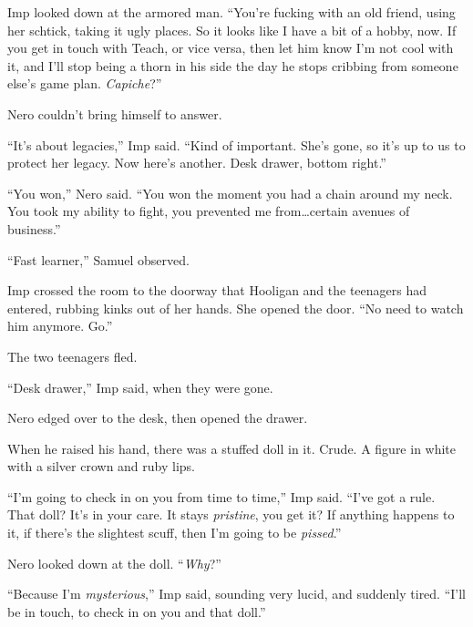 Imp looked down at the armored man.  ``You're fucking with an old friend, using her schtick, taking it ugly places.  So it looks like I have a bit of a hobby, now.  If you get in touch with Teach, or vice versa, then let him know I'm not cool with it, and I'll stop being a thorn in his side the day he stops cribbing from someone else's game plan.  \emph{Capiche}?''



Nero couldn't bring himself to answer.



``It's about legacies,'' Imp said.  ``Kind of important.  She's gone, so it's up to us to protect her legacy.  Now here's another.  Desk drawer, bottom right.''



``You won,'' Nero said.  ``You won the moment you had a chain around my neck.  You took my ability to fight, you prevented me from\ldots certain avenues of business.''



``Fast learner,'' Samuel observed.



Imp crossed the room to the doorway that Hooligan and the teenagers had entered, rubbing kinks out of her hands.  She opened the door.  ``No need to watch him anymore.  Go.''



The two teenagers fled.



``Desk drawer,'' Imp said, when they were gone.



Nero edged over to the desk, then opened the drawer.



When he raised his hand, there was a stuffed doll in it.  Crude.  A figure in white with a silver crown and ruby lips.



``I'm going to check in on you from time to time,'' Imp said.  ``I've got a rule.  That doll?  It's in your care.  It stays \emph{pristine}, you get it?  If anything happens to it, if there's the slightest scuff, then I'm going to be \emph{pissed}.''



Nero looked down at the doll.  ``\emph{Why}?''



``Because I'm \emph{mysterious},'' Imp said, sounding very lucid, and suddenly tired.  ``I'll be in touch, to check in on you and that doll.''



